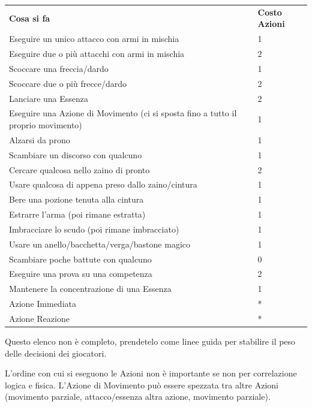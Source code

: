 \documentclass[a4paper,11pt,twoside,openany]{book}
\begin{document}
\begin{tabular}{ll}
	\toprule
	\textbf{Cosa si fa}                                & \textbf{Costo Azioni}\\
	Eseguire un unico attacco con armi in mischia      & 1\\
	Eseguire due o più attacchi con armi in mischia    & 2\\
	Scoccare una freccia/dardo                         & 1\\
	Scoccare due o più frecce/dardo                    & 2\\
	Lanciare una Essenza                               & 2\\
	Eseguire una Azione di Movimento (ci si sposta fino a tutto
	il proprio movimento)                              & 1\\
	Alzarsi da prono                                   & 1 \\
	Scambiare un discorso con qualcuno                 & 1\\
	Cercare qualcosa nello zaino di pronto             & 2\\
	Usare qualcosa di appena preso dallo zaino/cintura & 1\\
	Bere una pozione tenuta alla cintura               & 1\\
	Estrarre l'arma (poi rimane estratta)              & 1\\
	Imbracciare lo scudo (poi rimane imbracciato)      & 1\\
	Usare un anello/bacchetta/verga/bastone magico     & 1\\
	Scambiare poche battute con qualcuno               & 0\\
	Eseguire una prova su una competenza               & 2\\
	Mantenere la concentrazione di una Essenza         & 1\\
	Azione Immediata                                   & {*}\\
	Azione Reazione                                    & {*}\\
\end{tabular}

\smallskip

Questo elenco non è completo, prendetelo come linee guida per stabilire il peso delle decisioni dei giocatori.

\bigskip

L'ordine con cui si eseguono le Azioni non è importante se non per correlazione logica e fisica. L'Azione di Movimento può essere spezzata tra altre Azioni (movimento parziale, attacco/essenza altra azione, movimento parziale).
\end{document}
